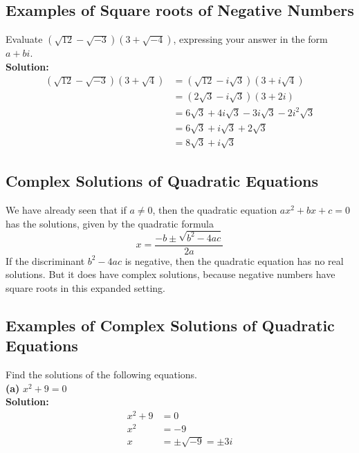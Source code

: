 \subsection{Examples of Square roots of Negative Numbers}
Evaluate $(\sqrt{12}-\sqrt{-3})(3+\sqrt{-4})$, expressing your answer in the form $a+bi$. \\
\newline
\textbf{Solution:} \\
\begin{align*}
    (\sqrt{12}-\sqrt{-3})(3+\sqrt{4}) & =(\sqrt{12}-i\sqrt{3})(3+i\sqrt{4})           \\
                                      & =(2\sqrt{3}-i\sqrt{3})(3+2i)                  \\
                                      & =6\sqrt{3}+4i\sqrt{3}-3i\sqrt{3}-2i^2\sqrt{3} \\
                                      & =6\sqrt{3}+i\sqrt{3}+2\sqrt{3}                \\
                                      & =8\sqrt{3}+i\sqrt{3}
\end{align*}

\subsection{Complex Solutions of Quadratic Equations}
We have already seen that if $a\neq0$, then the quadratic equation $ax^2+bx+c=0$ has the solutions, given by the quadratic formula $$x=\frac{-b\pm\sqrt{b^2-4ac}}{2a}$$
If the discriminant $b^2-4ac$ is negative, then the quadratic equation has no real solutions. But it does have complex solutions, because negative numbers have square roots in this expanded setting.

\subsection{Examples of Complex Solutions of Quadratic Equations}
Find the solutions of the following equations. \\
\newline
\textbf{(a)} $x^2+9=0$ \\
\textbf{Solution:} \\
\begin{align*}
    x^2+9 & =0                  \\
    x^2   & =-9                 \\
    x     & =\pm\sqrt{-9}=\pm3i
\end{align*}

